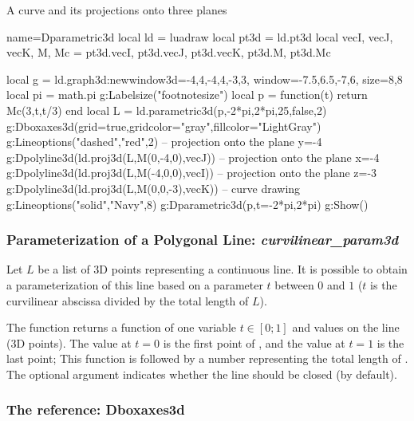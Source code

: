\begin{demo}{A curve and its projections onto three planes}
\begin{luadraw}{name=Dparametric3d}
local ld = luadraw
local pt3d = ld.pt3d
local vecI, vecJ, vecK, M, Mc = pt3d.vecI, pt3d.vecJ, pt3d.vecK, pt3d.M, pt3d.Mc

local g = ld.graph3d:new{window3d={-4,4,-4,4,-3,3}, window={-7.5,6.5,-7,6}, size={8,8}}
local pi = math.pi
g:Labelsize("footnotesize")
local p = function(t) return Mc(3,t,t/3) end
local L = ld.parametric3d(p,-2*pi,2*pi,25,false,2)
g:Dboxaxes3d({grid=true,gridcolor="gray",fillcolor="LightGray"})
g:Lineoptions("dashed","red",2)
-- projection onto the plane y=-4
g:Dpolyline3d(ld.proj3d(L,{M(0,-4,0),vecJ}))
-- projection onto the plane x=-4
g:Dpolyline3d(ld.proj3d(L,{M(-4,0,0),vecI}))
-- projection onto the plane z=-3
g:Dpolyline3d(ld.proj3d(L,{M(0,0,-3),vecK}))
-- curve drawing
g:Lineoptions("solid","Navy",8)
g:Dparametric3d(p,{t={-2*pi,2*pi}})
g:Show()
\end{luadraw}
\end{demo}

\subsubsection{Parameterization of a Polygonal Line: \emph{curvilinear\_param3d}}
Let $L$ be a list of 3D points representing a continuous line. It is possible to obtain a parameterization of this line based on a parameter $t$ between $0$ and $1$ ($t$ is the curvilinear abscissa divided by the total length of $L$).

The function  returns a function of one variable $t\in[0;1]$ and values ​​on the line  (3D points). The value at $t=0$ is the first point of , and the value at $t=1$ is the last point; This function is followed by a number representing the total length of . The optional argument  indicates whether the line should be closed (\false by default).

\subsubsection{The reference: Dboxaxes3d}

